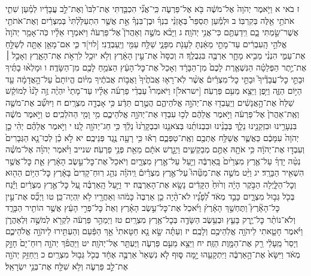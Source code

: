 \documentclass[twoside, openany, parskip=half, 11pt]{book}
\begin{document}
ז בֹאי א וַיֹּ֤אמֶר יְהֹוָה֙ אֶל־מֹשֶׁ֔ה בֹּ֖א אֶל־פַּרְעֹ֑ה כִּֽי־אֲנִ֞י הִכְבַּ֤דְתִּי אֶת־לִבּוֹ֙ וְאֶת־לֵ֣ב עֲבָדָ֔יו לְמַ֗עַן שִׁתִ֛י אֹתֹתַ֥י אֵ֖לֶּה בְּקִרְבּֽוֹ׃ ב וּלְמַ֡עַן תְּסַפֵּר֩ בְּאׇזְנֵ֨י בִנְךָ֜ וּבֶן־בִּנְךָ֗ אֵ֣ת אֲשֶׁ֤ר הִתְעַלַּ֙לְתִּי֙ בְּמִצְרַ֔יִם וְאֶת־אֹתֹתַ֖י אֲשֶׁר־שַׂ֣מְתִּי בָ֑ם וִֽידַעְתֶּ֖ם כִּי־אֲנִ֥י יְהֹוָֽה׃ ג וַיָּבֹ֨א מֹשֶׁ֣ה וְאַהֲרֹן֮ אֶל־פַּרְעֹה֒ וַיֹּאמְר֣וּ אֵלָ֗יו כֹּֽה־אָמַ֤ר יְהֹוָה֙ אֱלֹהֵ֣י הָֽעִבְרִ֔ים עַד־מָתַ֣י מֵאַ֔נְתָּ לֵעָנֹ֖ת מִפָּנָ֑י שַׁלַּ֥ח עַמִּ֖י וְיַֽעַבְדֻֽנִי׃ [לוי]ד כִּ֛י אִם־מָאֵ֥ן אַתָּ֖ה לְשַׁלֵּ֣חַ אֶת־עַמִּ֑י הִנְנִ֨י מֵבִ֥יא מָחָ֛ר אַרְבֶּ֖ה בִּגְבֻלֶֽךָ׃ ה וְכִסָּה֙ אֶת־עֵ֣ין הָאָ֔רֶץ וְלֹ֥א יוּכַ֖ל לִרְאֹ֣ת אֶת־הָאָ֑רֶץ וְאָכַ֣ל ׀ אֶת־יֶ֣תֶר הַפְּלֵטָ֗ה הַנִּשְׁאֶ֤רֶת לָכֶם֙ מִן־הַבָּרָ֔ד וְאָכַל֙ אֶת־כׇּל־הָעֵ֔ץ הַצֹּמֵ֥חַ לָכֶ֖ם מִן־הַשָּׂדֶֽה׃ ו וּמָלְא֨וּ בָתֶּ֜יךָ וּבָתֵּ֣י כׇל־עֲבָדֶ֘יךָ֮ וּבָתֵּ֣י כׇל־מִצְרַ֒יִם֒ אֲשֶׁ֨ר לֹֽא־רָא֤וּ אֲבֹתֶ֙יךָ֙ וַאֲב֣וֹת אֲבֹתֶ֔יךָ מִיּ֗וֹם הֱיוֹתָם֙ עַל־הָ֣אֲדָמָ֔ה עַ֖ד הַיּ֣וֹם הַזֶּ֑ה וַיִּ֥פֶן וַיֵּצֵ֖א מֵעִ֥ם פַּרְעֹֽה׃ [ישראל]ז וַיֹּאמְרוּ֩ עַבְדֵ֨י פַרְעֹ֜ה אֵלָ֗יו עַד־מָתַי֙ יִהְיֶ֨ה זֶ֥ה לָ֙נוּ֙ לְמוֹקֵ֔שׁ שַׁלַּח֙ אֶת־הָ֣אֲנָשִׁ֔ים וְיַֽעַבְד֖וּ אֶת־יְהֹוָ֣ה אֱלֹהֵיהֶ֑ם הֲטֶ֣רֶם תֵּדַ֔ע כִּ֥י אָבְדָ֖ה מִצְרָֽיִם׃ ח וַיּוּשַׁ֞ב אֶת־מֹשֶׁ֤ה וְאֶֽת־אַהֲרֹן֙ אֶל־פַּרְעֹ֔ה וַיֹּ֣אמֶר אֲלֵהֶ֔ם לְכ֥וּ עִבְד֖וּ אֶת־יְהֹוָ֣ה אֱלֹהֵיכֶ֑ם מִ֥י וָמִ֖י הַהֹלְכִֽים׃ ט וַיֹּ֣אמֶר מֹשֶׁ֔ה בִּנְעָרֵ֥ינוּ וּבִזְקֵנֵ֖ינוּ נֵלֵ֑ךְ בְּבָנֵ֨ינוּ וּבִבְנוֹתֵ֜נוּ בְּצֹאנֵ֤נוּ וּבִבְקָרֵ֙נוּ֙ נֵלֵ֔ךְ כִּ֥י חַג־יְהֹוָ֖ה לָֽנוּ׃ י וַיֹּ֣אמֶר אֲלֵהֶ֗ם יְהִ֨י כֵ֤ן יְהֹוָה֙ עִמָּכֶ֔ם כַּאֲשֶׁ֛ר אֲשַׁלַּ֥ח אֶתְכֶ֖ם וְאֶֽת־טַפְּכֶ֑ם רְא֕וּ כִּ֥י רָעָ֖ה נֶ֥גֶד פְּנֵיכֶֽם׃ יא לֹ֣א כֵ֗ן לְכֽוּ־נָ֤א הַגְּבָרִים֙ וְעִבְד֣וּ אֶת־יְהֹוָ֔ה כִּ֥י אֹתָ֖הּ אַתֶּ֣ם מְבַקְשִׁ֑ים וַיְגָ֣רֶשׁ אֹתָ֔ם מֵאֵ֖ת פְּנֵ֥י פַרְעֹֽה׃
שנייב וַיֹּ֨אמֶר יְהֹוָ֜ה אֶל־מֹשֶׁ֗ה נְטֵ֨ה יָדְךָ֜ עַל־אֶ֤רֶץ מִצְרַ֙יִם֙ בָּֽאַרְבֶּ֔ה וְיַ֖עַל עַל־אֶ֣רֶץ מִצְרָ֑יִם וְיֹאכַל֙ אֶת־כׇּל־עֵ֣שֶׂב הָאָ֔רֶץ אֵ֛ת כׇּל־אֲשֶׁ֥ר הִשְׁאִ֖יר הַבָּרָֽד׃ יג וַיֵּ֨ט מֹשֶׁ֣ה אֶת־מַטֵּ֘הוּ֮ עַל־אֶ֣רֶץ מִצְרַ֒יִם֒ וַֽיהֹוָ֗ה נִהַ֤ג רֽוּחַ־קָדִים֙ בָּאָ֔רֶץ כׇּל־הַיּ֥וֹם הַה֖וּא וְכׇל־הַלָּ֑יְלָה הַבֹּ֣קֶר הָיָ֔ה וְר֙וּחַ֙ הַקָּדִ֔ים נָשָׂ֖א אֶת־הָאַרְבֶּֽה׃ יד וַיַּ֣עַל הָֽאַרְבֶּ֗ה עַ֚ל כׇּל־אֶ֣רֶץ מִצְרַ֔יִם וַיָּ֕נַח בְּכֹ֖ל גְּב֣וּל מִצְרָ֑יִם כָּבֵ֣ד מְאֹ֔ד לְ֠פָנָ֠יו לֹא־הָ֨יָה כֵ֤ן אַרְבֶּה֙ כָּמֹ֔הוּ וְאַחֲרָ֖יו לֹ֥א יִֽהְיֶה־כֵּֽן׃ טו וַיְכַ֞ס אֶת־עֵ֣ין כׇּל־הָאָ֘רֶץ֮ וַתֶּחְשַׁ֣ךְ הָאָ֒רֶץ֒ וַיֹּ֜אכַל אֶת־כׇּל־עֵ֣שֶׂב הָאָ֗רֶץ וְאֵת֙ כׇּל־פְּרִ֣י הָעֵ֔ץ אֲשֶׁ֥ר הוֹתִ֖יר הַבָּרָ֑ד וְלֹא־נוֹתַ֨ר כׇּל־יֶ֧רֶק בָּעֵ֛ץ וּבְעֵ֥שֶׂב הַשָּׂדֶ֖ה בְּכׇל־אֶ֥רֶץ מִצְרָֽיִם׃ טז וַיְמַהֵ֣ר פַּרְעֹ֔ה לִקְרֹ֖א לְמֹשֶׁ֣ה וּֽלְאַהֲרֹ֑ן וַיֹּ֗אמֶר חָטָ֛אתִי לַיהֹוָ֥ה אֱלֹֽהֵיכֶ֖ם וְלָכֶֽם׃ יז וְעַתָּ֗ה שָׂ֣א נָ֤א חַטָּאתִי֙ אַ֣ךְ הַפַּ֔עַם וְהַעְתִּ֖ירוּ לַיהֹוָ֣ה אֱלֹהֵיכֶ֑ם וְיָסֵר֙ מֵֽעָלַ֔י רַ֖ק אֶת־הַמָּ֥וֶת הַזֶּֽה׃ יח וַיֵּצֵ֖א מֵעִ֣ם פַּרְעֹ֑ה וַיֶּעְתַּ֖ר אֶל־יְהֹוָֽה׃ יט וַיַּהֲפֹ֨ךְ יְהֹוָ֤ה רֽוּחַ־יָם֙ חָזָ֣ק מְאֹ֔ד וַיִּשָּׂא֙ אֶת־הָ֣אַרְבֶּ֔ה וַיִּתְקָעֵ֖הוּ יָ֣מָּה סּ֑וּף לֹ֤א נִשְׁאַר֙ אַרְבֶּ֣ה אֶחָ֔ד בְּכֹ֖ל גְּב֥וּל מִצְרָֽיִם׃ כ וַיְחַזֵּ֥ק יְהֹוָ֖ה אֶת־לֵ֣ב פַּרְעֹ֑ה וְלֹ֥א שִׁלַּ֖ח אֶת־בְּנֵ֥י יִשְׂרָאֵֽל׃
\end{document}
